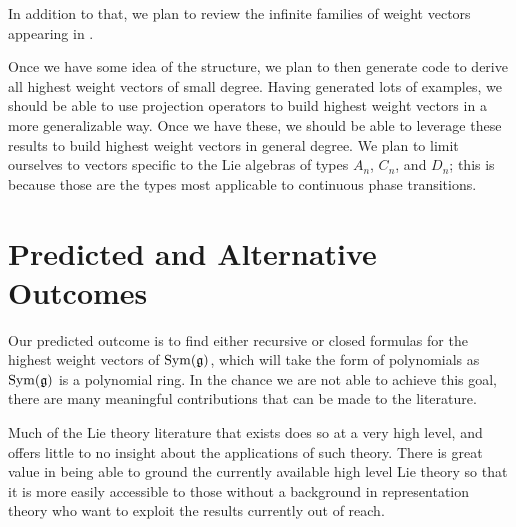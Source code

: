 \documentclass[11pt, reqno]{amsart}
\begin{document}
In addition to that, we plan to review the infinite families of weight vectors appearing in \cite{C20}. %

Once we have some idea of the structure, we plan to then generate code to derive all highest weight vectors of small degree. Having generated lots of examples, we should be able to use projection operators to build highest weight vectors in a more generalizable way. Once we have these, we should be able to leverage these results to build highest weight vectors in general degree. We plan to limit ourselves to vectors specific to the Lie algebras of types $A_{n}$, $C_{n}$, and $D_{n}$; this is because those are the types most applicable to continuous phase transitions.


\section{Predicted and Alternative Outcomes}

Our predicted outcome is to find either recursive or closed formulas for the highest weight vectors of $\operatorname{Sym}(\mathfrak{g})$, which will take the form of polynomials as $\operatorname{Sym}(\mathfrak{g})$ is a polynomial ring. In the chance we are not able to achieve this goal, there are many meaningful contributions that can be made to the literature.

Much of the Lie theory literature that exists does so at a very high level, and offers little to no insight about the applications of such theory. There is great value in being able to ground the currently available high level Lie theory so that it is more easily accessible to those without a background in representation theory who want to exploit the results currently out of reach.
\end{document}
